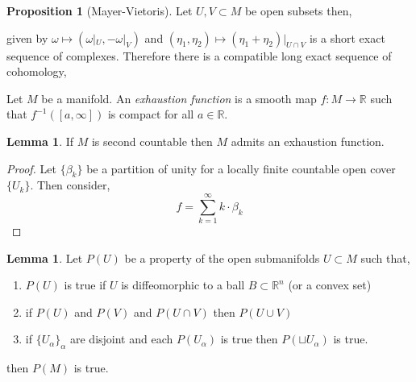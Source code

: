 \documentclass[12pt]{extarticle}
\newcommand{\R}{\mathbb{R}}
\theoremstyle{definition}
\newtheorem{lemma}[theorem]{Lemma}
\newtheorem{proposition}[theorem]{Proposition}
\newenvironment{definition}[1][Definition:]{\begin{trivlist}
\item[\hskip \labelsep {\bfseries #1}]}{\end{trivlist}}
\begin{document}
\begin{proposition}[Mayer-Vietoris]
Let $U, V \subset M$ be open subsets then,
\begin{center}
\end{center}
given by $\omega \mapsto (\omega|_U, - \omega|_V)$ and $(\eta_1, \eta_2) \mapsto (\eta_1 + \eta_2)|_{U \cap V}$ is a short exact sequence of complexes. Therefore there is a compatible long exact sequence of cohomology,
\begin{center}
\end{center}
\end{proposition}

\begin{definition}
Let $M$ be a manifold. An \textit{exhaustion function} is a smooth map $f : M \to \R$ such that $f^{-1}([a, \infty])$ is compact for all $a \in \R$.
\end{definition}

\begin{lemma}
If $M$ is second countable then $M$ admits an exhaustion function.
\end{lemma}

\begin{proof}
Let $\{ \beta_k \}$ be a partition of unity for a locally finite countable open cover $\{ U_k \}$. Then consider,
\[ f = \sum_{k = 1}^\infty k \cdot \beta_k \]
\end{proof}

\begin{lemma}
Let $P(U)$ be a property of the open submanifolds $U \subset M$ such that,
\begin{enumerate}
\item $P(U)$ is true if $U$ is diffeomorphic to a ball $B \subset \R^n$ (or a convex set)
\item if $P(U)$ and $P(V)$ and $P(U \cap V)$ then $P(U \cup V)$
\item if $\{ U_\alpha \}_{\alpha}$ are disjoint and each $P(U_\alpha)$ is true then $P(\sqcup U_\alpha)$ is true.
\end{enumerate}
then $P(M)$ is true. 
\end{lemma}
\end{document}
